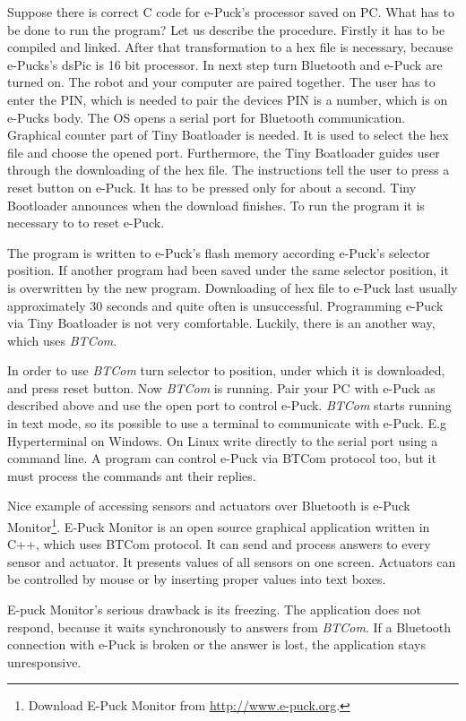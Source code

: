 \documentclass[12pt,notitlepage]{report}
\begin{document}
	Suppose there is correct C code for e-Puck's processor saved on PC. What has to be done to run the program?
	Let us describe the procedure.
	Firstly it has to be compiled and linked. After that transformation to a hex file is necessary,
	because e-Pucks's dsPic is 16 bit processor. In next step turn Bluetooth and e-Puck are turned on. 
	The robot and your computer are paired together. The user has to enter the PIN, 
 	which is needed to pair the devices 
	PIN is a number, which is on e-Pucks body.
	The OS opens a serial port for Bluetooth communication.
	Graphical counter part of Tiny Boatloader is needed. It is used to select the hex file and choose the opened port. 
	Furthermore, the Tiny Boatloader guides user through the downloading of the hex file.
	The instructions tell the user to press a reset button on e-Puck. It has to be pressed only for about a second.
	Tiny Bootloader announces when the download finishes. To run the program it is necessary to to reset e-Puck.
	 
	The program is written to e-Puck's flash memory according e-Puck's selector position.
	If another program had been saved under the same selector position, it is overwritten by the new program.
	Downloading of hex file to e-Puck last usually approximately 30 seconds and quite often is unsuccessful. 
	Programming e-Puck via Tiny Boatloader is not very comfortable. 
	Luckily, there is an another way, which uses {\it BTCom}. 

	In order to use {\it BTCom} turn selector to position, under which it is downloaded, and press reset button.
	Now {\it BTCom} is running.  Pair your PC with e-Puck as described above and use the open port
	to control e-Puck.
	{\it BTCom} starts running in text mode, so its possible to use a terminal to communicate with e-Puck.
	E.g Hyperterminal on Windows. On Linux write directly to the serial port using a command line.
	A program can control e-Puck via BTCom protocol too, but it must process the commands ant their replies.
	 
	Nice example of accessing sensors and actuators over Bluetooth is 
	e-Puck Monitor\footnote{\small{Download E-Puck Monitor from \url{http://www.e-puck.org}.}}.
	E-Puck Monitor is an open source graphical application written in C++, which uses BTCom protocol. 
	It can send and process answers to every sensor and actuator.
	It presents values of all sensors on one screen. Actuators can be controlled by mouse or by inserting
	proper values into text boxes.

	E-puck Monitor's serious drawback is its freezing. The application does not respond, 
	because it waits synchronously to answers from {\it BTCom}.
	If a Bluetooth connection with e-Puck is broken or the answer is lost, the application stays unresponsive.
	 
\end{document}
